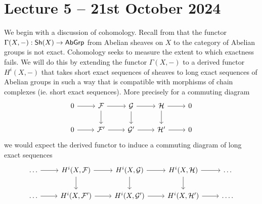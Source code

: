 \section{Lecture 5 -- 21st October 2024}\label{sec: lecture 5}
We begin with a discussion of cohomology. Recall from  that the functor $\Gamma(X,-):\mathsf{Sh}(X)\to\mathsf{AbGrp}$ from Abelian sheaves on $X$ to the category of Abelian groups is not exact. Cohomology seeks to measure the extent to which exactness fails. We will do this by extending the functor $\Gamma(X,-)$ to a derived functor $H^{i}(X,-)$ that takes short exact sequences of sheaves to long exact sequences of Abelian groups in such a way that is compatible with morphisms of chain complexes (ie. short exact sequences). More precisely for a commuting diagram 
$$%
\begin{tikzcd}
	0 & \Fcal & \Gcal & \Hcal & 0 \\
	0 & {\Fcal'} & {\Gcal'} & {\Hcal'} & 0
	\arrow[from=1-1, to=1-2]
	\arrow[from=1-2, to=1-3]
	\arrow[from=1-2, to=2-2]
	\arrow[from=1-3, to=1-4]
	\arrow[from=1-3, to=2-3]
	\arrow[from=1-4, to=1-5]
	\arrow[from=1-4, to=2-4]
	\arrow[from=2-1, to=2-2]
	\arrow[from=2-2, to=2-3]
	\arrow[from=2-3, to=2-4]
	\arrow[from=2-4, to=2-5]
\end{tikzcd}$$
we would expect the derived functor to induce a commuting diagram of long exact sequences
$$%
\begin{tikzcd}
	\dots & {H^{i}(X,\Fcal)} & {H^{i}(X,\Gcal)} & {H^{i}(X,\Hcal)} & \dots \\
	\dots & {H^{i}(X,\Fcal')} & {H^{i}(X,\Gcal')} & {H^{i}(X,\Hcal')} & \dots.
	\arrow[from=1-1, to=1-2]
	\arrow[from=1-2, to=1-3]
	\arrow[from=1-2, to=2-2]
	\arrow[from=1-3, to=1-4]
	\arrow[from=1-3, to=2-3]
	\arrow[from=1-4, to=1-5]
	\arrow[from=1-4, to=2-4]
	\arrow[from=2-1, to=2-2]
	\arrow[from=2-2, to=2-3]
	\arrow[from=2-3, to=2-4]
	\arrow[from=2-4, to=2-5]
\end{tikzcd}$$
